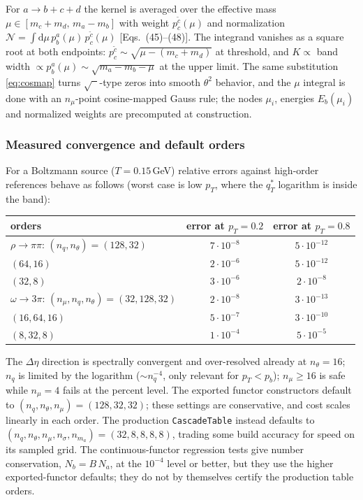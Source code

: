 \documentclass[11pt]{article}
\begin{document}
For $a\to b+c+d$ the kernel is averaged over the effective mass
$\mu\in[m_c+m_d,\,m_a-m_b]$ with weight
$p^{\tilde c}_c(\mu)$ and normalization
$\mathcal N=\int\mathrm{d}\mu\,p^a_b(\mu)\,p^{\tilde c}_c(\mu)$
[Eqs.~(45)--(48)].  The integrand vanishes as a square root at both
endpoints: $p^{\tilde c}_c\sim\sqrt{\mu-(m_c+m_d)}$ at threshold, and
$K\propto$ band width $\propto p^a_b(\mu)\sim\sqrt{m_a-m_b-\mu}$ at the
upper limit.  The same substitution \eqref{eq:cosmap} turns
$\sqrt{\phantom{x}}$-type zeros into smooth $\theta^{2}$ behavior, and the
$\mu$ integral is done with an $n_\mu$-point cosine-mapped Gauss rule; the
nodes $\mu_i$, energies $E_b(\mu_i)$ and normalized weights are
precomputed at construction.

\subsubsection{Measured convergence and default orders}

For a Boltzmann source ($T=0.15$\,GeV) relative errors against
high-order references behave as follows (worst case is low $p_T$, where
the $q_T^{*}$ logarithm is inside the band):
\begin{center}
\begin{tabular}{lcc}
\hline
orders & error at $p_T=0.2$ & error at $p_T=0.8$ \\
\hline
$\rho\to\pi\pi$:\; $(n_q,n_\theta)=(128,32)$ & $7\cdot10^{-8}$ & $5\cdot10^{-12}$\\
\phantom{$\rho\to\pi\pi$:}\; $(64,16)$ & $2\cdot10^{-6}$ & $5\cdot10^{-12}$\\
\phantom{$\rho\to\pi\pi$:}\; $(32,8)$ & $3\cdot10^{-6}$ & $2\cdot10^{-8}$\\
\hline
$\omega\to3\pi$:\; $(n_\mu,n_q,n_\theta)=(32,128,32)$ & $2\cdot10^{-8}$ & $3\cdot10^{-13}$\\
\phantom{$\omega\to3\pi$:}\; $(16,64,16)$ & $5\cdot10^{-7}$ & $3\cdot10^{-10}$\\
\phantom{$\omega\to3\pi$:}\; $(8,32,8)$ & $1\cdot10^{-4}$ & $5\cdot10^{-5}$\\
\hline
\end{tabular}
\end{center}
The $\Delta\eta$ direction is spectrally convergent and over-resolved
already at $n_\theta=16$; $n_q$ is limited by the logarithm
($\sim n_q^{-4}$, only relevant for $p_T<p_b$); $n_\mu\ge16$ is safe while
$n_\mu=4$ fails at the percent level.  The exported functor constructors
default to $(n_q,n_\theta,n_\mu)=(128,32,32)$; these settings are
conservative, and cost scales linearly in each order.  The production
\texttt{CascadeTable} instead defaults to
$(n_q,n_\theta,n_\mu,n_\sigma,n_{m_a})=(32,8,8,8,8)$, trading some build
accuracy for speed on its sampled grid.  The continuous-functor regression
tests give number conservation, $N_b=B\,N_a$, at the $10^{-4}$ level or
better, but they use the higher exported-functor defaults; they do not by
themselves certify the production table orders.
\end{document}
